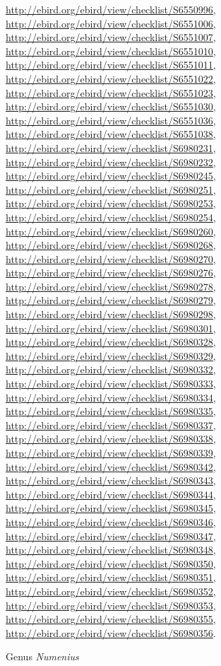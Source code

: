 \documentclass[9pt, article]{memoir}
\begin{document}
\begin{multicols}{2}
\url{http://ebird.org/ebird/view/checklist/S6550996}, 
\url{http://ebird.org/ebird/view/checklist/S6551006}, 
\url{http://ebird.org/ebird/view/checklist/S6551007}, 
\url{http://ebird.org/ebird/view/checklist/S6551010}, 
\url{http://ebird.org/ebird/view/checklist/S6551011}, 
\url{http://ebird.org/ebird/view/checklist/S6551022}, 
\url{http://ebird.org/ebird/view/checklist/S6551023}, 
\url{http://ebird.org/ebird/view/checklist/S6551030}, 
\url{http://ebird.org/ebird/view/checklist/S6551036}, 
\url{http://ebird.org/ebird/view/checklist/S6551038}, 
\url{http://ebird.org/ebird/view/checklist/S6980231}, 
\url{http://ebird.org/ebird/view/checklist/S6980232}, 
\url{http://ebird.org/ebird/view/checklist/S6980245}, 
\url{http://ebird.org/ebird/view/checklist/S6980251}, 
\url{http://ebird.org/ebird/view/checklist/S6980253}, 
\url{http://ebird.org/ebird/view/checklist/S6980254}, 
\url{http://ebird.org/ebird/view/checklist/S6980260}, 
\url{http://ebird.org/ebird/view/checklist/S6980268}, 
\url{http://ebird.org/ebird/view/checklist/S6980270}, 
\url{http://ebird.org/ebird/view/checklist/S6980276}, 
\url{http://ebird.org/ebird/view/checklist/S6980278}, 
\url{http://ebird.org/ebird/view/checklist/S6980279}, 
\url{http://ebird.org/ebird/view/checklist/S6980298}, 
\url{http://ebird.org/ebird/view/checklist/S6980301}, 
\url{http://ebird.org/ebird/view/checklist/S6980328}, 
\url{http://ebird.org/ebird/view/checklist/S6980329}, 
\url{http://ebird.org/ebird/view/checklist/S6980332}, 
\url{http://ebird.org/ebird/view/checklist/S6980333}, 
\url{http://ebird.org/ebird/view/checklist/S6980334}, 
\url{http://ebird.org/ebird/view/checklist/S6980335}, 
\url{http://ebird.org/ebird/view/checklist/S6980337}, 
\url{http://ebird.org/ebird/view/checklist/S6980338}, 
\url{http://ebird.org/ebird/view/checklist/S6980339}, 
\url{http://ebird.org/ebird/view/checklist/S6980342}, 
\url{http://ebird.org/ebird/view/checklist/S6980343}, 
\url{http://ebird.org/ebird/view/checklist/S6980344}, 
\url{http://ebird.org/ebird/view/checklist/S6980345}, 
\url{http://ebird.org/ebird/view/checklist/S6980346}, 
\url{http://ebird.org/ebird/view/checklist/S6980347}, 
\url{http://ebird.org/ebird/view/checklist/S6980348}, 
\url{http://ebird.org/ebird/view/checklist/S6980350}, 
\url{http://ebird.org/ebird/view/checklist/S6980351}, 
\url{http://ebird.org/ebird/view/checklist/S6980352}, 
\url{http://ebird.org/ebird/view/checklist/S6980353}, 
\url{http://ebird.org/ebird/view/checklist/S6980355}, 
\url{http://ebird.org/ebird/view/checklist/S6980356}.

\vspace{6pt}\noindent\hspace{30pt}Genus \textit{Numenius}



\end{multicols}
\end{document}
